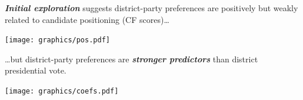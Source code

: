 \documentclass[a0]{a0poster}
\begin{document}
\begin{multicols*}{3}
\emph{\textbf{Initial exploration}} suggests district-party preferences are positively but weakly related to candidate positioning (CF scores)\ldots

\begin{center}
  \texttt{[image: graphics/pos.pdf]}
\end{center}

\ldots but district-party preferences are \emph{\textbf{stronger predictors}} than district presidential vote.

\vspace{1em}

\begin{center}
  \texttt{[image: graphics/coefs.pdf]}
\end{center}



%
\vfill
\footnotesize
\printbibliography
% 
% 

\end{multicols*}
\end{document}
